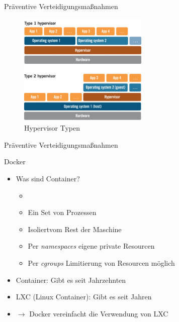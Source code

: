 \begin{frame}{Präventive Verteidigungsmaßnahmen}
        \begin{figure}
                \centering
                \includegraphics[width=0.55\textwidth]{assets/hypervisor}
                \caption{Hypervisor Typen \footnotemark}
        \end{figure}

\end{frame}

\begin{frame}{Präventive Verteidigungsmaßnahmen}
        \begin{block}{Docker}
                \begin{itemize}[<+->]
                        \item Was sind Container?
                        \begin{itemize}[<+->]
                                \item \textbf{}\footnotemark
                                \item Ein Set von Prozessen
                                \item Isoliert\footnotemark vom Rest der Maschine
                                \item Per \textit{namespaces} eigene private Resourcen
                                \item Per \textit{cgroups} Limitierung von Resourcen möglich
                        \end{itemize}
                        \item Container: Gibt es seit Jahrzehnten
                        \item LXC (Linux Container): Gibt es seit Jahren
                        \item $\rightarrow$ Docker vereinfacht die Verwendung von LXC 
                \end{itemize}
        \end{block}

\end{frame}


